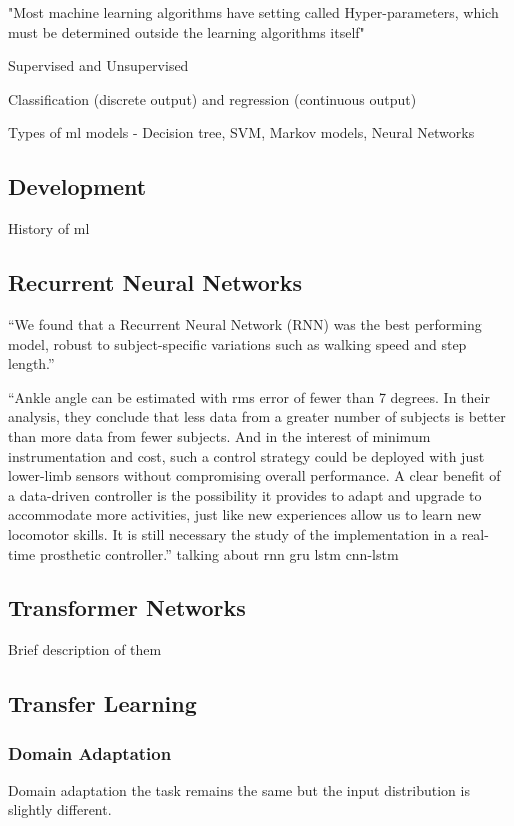 "Most machine learning algorithms have setting called Hyper-parameters, which must be determined outside the learning algorithms itself"\cite{Goodfellow2015}

Supervised and Unsupervised

Classification (discrete output) and regression (continuous output)

Types of ml models - Decision tree, SVM, Markov models, Neural Networks

\subsection{Development}
History of \acrshort{ml}

\subsection{Recurrent Neural Networks}

``We found that a Recurrent Neural Network (RNN) was the best performing model, robust to subject-specific variations such as walking speed and step length.''\cite{Rai2019a}

``Ankle angle can be estimated with rms error of fewer than 7 degrees. In their analysis, they conclude that less data from a greater number of subjects is better than more data from fewer subjects. And in the interest of minimum instrumentation and cost, such a control strategy could be deployed with just lower-limb sensors without compromising overall performance. A clear benefit of a data-driven controller is the possibility it provides to adapt and upgrade to accommodate more activities, just like new experiences allow us to learn new locomotor skills. It is still necessary the study of the implementation in a real-time prosthetic controller.''\cite{Hernandez2021} talking about \cite{Rai2019a}
\acrshort{rnn}
\acrshort{gru}
\acrshort{lstm}
\acrshort{cnn}-\acrshort{lstm}

\subsection{Transformer Networks}
Brief description of them

\subsection{Transfer Learning}


\subsubsection{Domain Adaptation} %
Domain adaptation the task remains the same but the input distribution is slightly different.\cite{Goodfellow2015}


